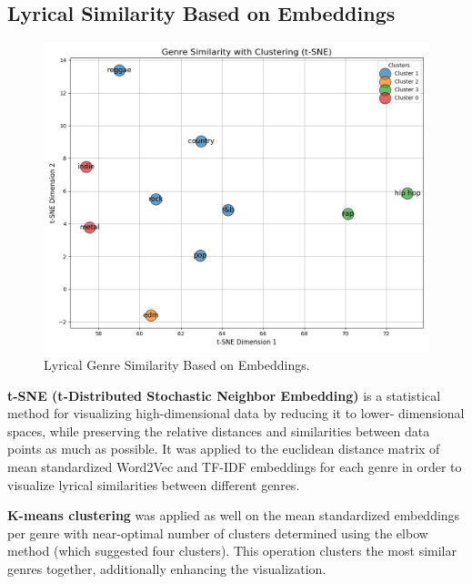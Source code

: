\subsection{Lyrical Similarity Based on Embeddings}
\begin{center}
\begin{figure}[H]
  \centering
  \includegraphics[width=6in]{img/tsne_genres.png}
  \caption{Lyrical Genre Similarity Based on Embeddings.}
  \label{Figure:tsne_genres}
\end{figure}
\end{center}
\textbf{t-SNE (t-Distributed Stochastic Neighbor Embedding)} is a statistical method for
visualizing high-dimensional data by reducing it to lower- dimensional spaces,
while preserving the relative distances and similarities between data points as
much as possible. It was applied to the euclidean distance matrix of mean
standardized Word2Vec and TF-IDF embeddings for each genre in order to
visualize lyrical similarities between different genres.

\textbf{K-means clustering} was applied as well on the mean standardized
embeddings per genre with near-optimal number of clusters determined using the
elbow method (which suggested four clusters). This operation clusters the most
similar genres together, additionally enhancing the visualization.



